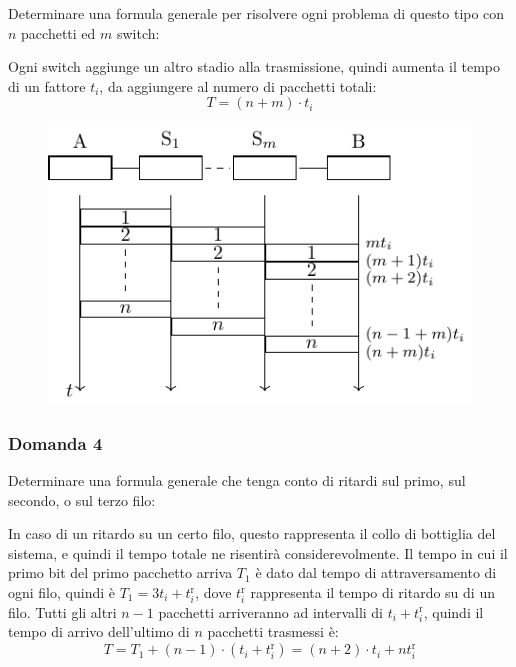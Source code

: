\documentclass{article}
\numberwithin{equation}{subsection}
\begin{document}
Determinare una formula generale per risolvere ogni problema di questo tipo con $n$ pacchetti ed $m$ switch:

Ogni switch aggiunge un altro stadio alla trasmissione, quindi aumenta il tempo di un fattore $t_i$, da aggiungere al numero di pacchetti totali:
\begin{equation}
    T=(n+m)\cdot t_i
\end{equation}

\begin{figure}[H]%
    \centering%
    \includegraphics{effetto_store_forward_domanda_3.pdf}%
\end{figure}

\subsubsection*{Domanda 4}

Determinare una formula generale che tenga conto di ritardi sul primo, sul secondo, o sul terzo filo: 

In caso di un ritardo su un certo filo, questo rappresenta il collo di bottiglia del sistema, e quindi il tempo totale ne risentirà 
considerevolmente. Il tempo in cui il primo bit del primo pacchetto arriva $T_1$ è dato dal tempo di attraversamento di ogni filo, quindi è $T_1=3t_i+t_i^{\mathrm{r}}$, 
dove $t_i^{\mathrm{r}}$ rappresenta il tempo di ritardo su di un filo. Tutti gli altri $n-1$ pacchetti arriveranno ad intervalli di $t_i+t_i^{\mathrm{r}}$, quindi il tempo di arrivo 
dell'ultimo di $n$ pacchetti trasmessi è:
\begin{equation}
    T=T_1+(n-1)\cdot (t_i+t_i^{\mathrm{r}})=(n+2)\cdot t_i+nt_i^{\mathrm{r}}
\end{equation}

\end{document}
